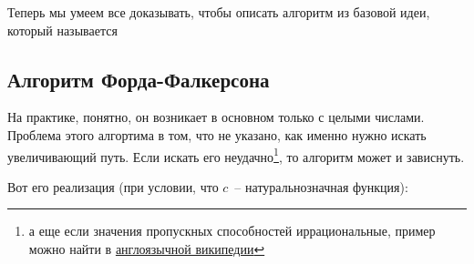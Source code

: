 Теперь мы умеем все доказывать, чтобы описать алгоритм из базовой идеи, который называется
\subsection{Алгоритм Форда-Фалкерсона}
На практике, понятно, он возникает в основном только с целыми числами. Проблема этого алгортима в том, что не указано, как именно нужно искать увеличивающий путь. Если искать его неудачно\footnote{а еще если значения пропускных способностей иррациональные, пример можно найти в \href{https://en.wikipedia.org/wiki/Ford-Fulkerson_algorithm}{англоязычной википедии}}, то алгоритм может и зависнуть.

Вот его реализация (при условии, что $c$~-- натуральнозначная функция):

\begin{algorithm}[H]
\DontPrintSemicolon
{}
\end{algorithm}

